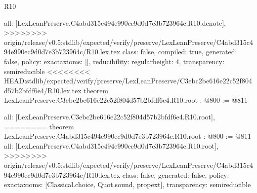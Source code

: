 \begin{lexlean}{R10}
\begin{coremodule}
{{{{{{{{{  all: [LexLeanPreserve.C4abd315c494e990ec9d0d7e3b723964c.R10.denote],
>>>>>>>> origin/release/v0.5:stdlib/expected/verify/preserve/LexLeanPreserve/C4abd315c494e990ec9d0d7e3b723964c/R10.lex.tex
  class: false,
  compiled: true,
  generated: false,
  policy: exact{axioms: []},
  reducibility: regular{height: 4},
  transparency: semireducible
}
<<<<<<<< HEAD:stdlib/expected/verify/preserve/LexLeanPreserve/C3ebc2be616e22c52f804d57b2bfdf6e4/R10.lex.tex
theorem LexLeanPreserve.C3ebc2be616e22c52f804d57b2bfdf6e4.R10.root : @800 := @811 {
  all: [LexLeanPreserve.C3ebc2be616e22c52f804d57b2bfdf6e4.R10.root],
========
theorem LexLeanPreserve.C4abd315c494e990ec9d0d7e3b723964c.R10.root : @800 := @811 {
  all: [LexLeanPreserve.C4abd315c494e990ec9d0d7e3b723964c.R10.root],
>>>>>>>> origin/release/v0.5:stdlib/expected/verify/preserve/LexLeanPreserve/C4abd315c494e990ec9d0d7e3b723964c/R10.lex.tex
  class: false,
  generated: false,
  policy: exact{axioms: [Classical.choice, Quot.sound, propext]},
  transparency: semireducible
}

}}}}}}}}}
\end{coremodule}
\end{lexlean}
